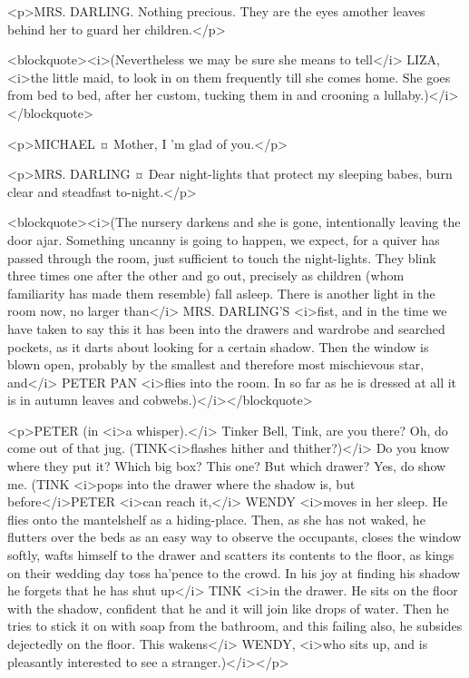 <p>MRS. DARLING. Nothing precious. They are the eyes amother leaves behind her to guard her children.</p>

<blockquote><i>(Nevertheless we may be sure she means to tell</i> LIZA, <i>the little maid, to look in on them frequently till she comes home. She goes from bed to bed, after her custom, tucking them in and crooning a lullaby.)</i></blockquote>

<p>MICHAEL ¤
Mother, I 'm glad of you.</p>

<p>MRS. DARLING ¤
Dear night-lights that protect my sleeping babes, burn clear and steadfast to-night.</p>

<blockquote><i>(The nursery darkens and she is gone, intentionally leaving the door ajar. Something uncanny is going to happen, we expect, for a quiver has passed through the room, just sufficient to touch the night-lights. They blink three times one after the other and go out, precisely as children (whom familiarity has made them resemble) fall asleep. There is another light in the room now, no larger than</i> MRS. DARLING'S <i>fist, and in the time we have taken to say this it has been into the drawers and wardrobe and searched pockets, as it darts about looking for a certain shadow. Then the window is blown open, probably by the smallest and therefore most mischievous star, and</i> PETER PAN <i>flies into the room. In so far as he is dressed at all it is in autumn leaves and cobwebs.)</i></blockquote>

<p>PETER (in <i>a whisper).</i> Tinker Bell, Tink, are you there?
Oh, do come out of that jug. (TINK<i>flashes hither and thither?)</i> Do you know where they put it?
Which big box? This one? But which drawer? Yes, do show me. (TINK <i>pops into the drawer where the shadow is, but before</i>PETER <i>can reach it,</i> WENDY <i>moves in her sleep. He flies onto the mantelshelf as a hiding-place. Then, as she has not waked, he flutters over the beds as an easy way to observe the occupants, closes the window softly, wafts himself to the drawer and scatters its contents to the floor, as kings on their wedding day toss ha'pence to the crowd. In his joy at finding his shadow he forgets that he has shut up</i> TINK <i>in the drawer. He sits on the floor with the shadow, confident that he and it will join like drops of water. Then he tries to stick it on with soap from the bathroom, and this failing also, he subsides dejectedly on the floor. This wakens</i> WENDY, <i>who sits up, and is pleasantly interested to see a stranger.)</i></p>

